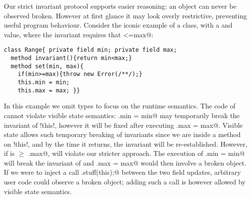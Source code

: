 Our strict invariant protocol supports easier reasoning: an object can never be observed broken. However 
at first glance it may look overly restrictive, preventing useful program behaviour.
Consider the iconic example of a \Q@Range@ class, with a \Q@min@ and \Q@max@
value, where the invariant requires that \Q@min<=max@:
\begin{lstlisting}
class Range{ private field min; private field max;
  method invariant(){return min<max;}
  method set(min, max){
    if(min>=max){throw new Error(/**/);}
    this.min = min;
    this.max = max; }}
\end{lstlisting}
In this example we omit types to focus on the runtime semantics.
The code of \Q@set@ cannot violate visible state semantics:
\Q@this.min = min@ may temporarily break the invariant of \Q!this!, however it will be fixed after executing \Q@this.max = max@. Visible state allows such temporary breaking of invariants since we are inside a method on \Q!this!, and by the time it returns, the invariant will be re-established.
However, if \Q@min@ is $\geq$ \Q@this.max@, \Q@set@ will violate our stricter approach. The execution of
\Q@this.min = min@ will break the invariant of \Q@this@ and \Q@this.max = max@ would then involve a broken object. If we were to inject a call
\Q@Do.stuff(this);@ between the two field updates, arbitrary user code could observe a broken object; 
  adding such a call is however allowed by visible state semantics.


